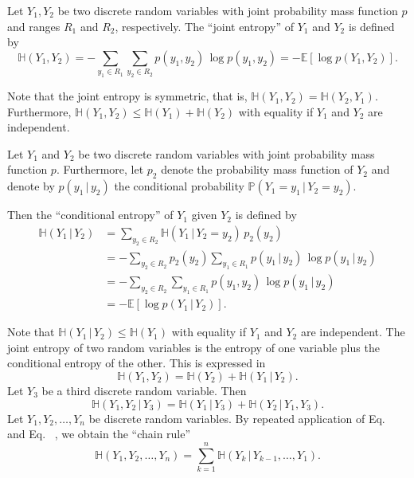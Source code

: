 \documentclass[smallextended]{svjour3}
\makeatletter
\renewcommand*{\eqref}[1]{%
  \hyperref[{#1}]{\textup{\tagform@{\ref*{#1}}}}%
}
\renewcommand{\P}{\mathbb{P}}
\newcommand{\E}{\mathbb{E}}
\renewcommand{\H}{\mathbb{H}}
\newcommand{\suml}{\sum\limits}
\newcommand{\ie}{that is}
\renewcommand{\emph}[1]{``#1''}
\makeatother
\begin{document}
\begin{definition}%
		Let $Y_1,Y_2$ be two discrete random variables with joint probability mass function $p$ and ranges $R_1$ and $R_2$, respectively.
		The \emph{joint entropy} of $Y_1$ and $Y_2$ is defined by
		\begin{equation}
			\H(Y_1,Y_2) = -\suml_{y_1\in R_1}\suml_{y_2\in R_2} p(y_1,y_2)\,\log p(y_1,y_2) = -\E\left[\log p(Y_1,Y_2)\right].
		\end{equation}
\end{definition}
Note that the joint entropy is symmetric, \ie, $\H(Y_1,Y_2) = \H(Y_2,Y_1)$.
Furthermore, $\H(Y_1,Y_2)\leq \H(Y_1) + \H(Y_2)$ with equality if $Y_1$ and $Y_2$ are independent.

\begin{definition}%
\label{def:conditional_entropy}
	Let $Y_1$ and $Y_2$ be two discrete random variables with joint probability mass function $p$.
	Furthermore, let $p_2$ denote the probability mass function of $Y_2$ and denote by $p(y_1\,|\,y_2)$ the conditional probability $\P(Y_1=y_1\,|\,Y_2=y_2)$.
	
	Then the \emph{conditional entropy} of $Y_1$ given $Y_2$ is defined by
	\begin{equation}
		\begin{aligned}
			\H(Y_1\,|\,Y_2) &= \suml_{y_2\in R_2} \H(Y_1\,|\,Y_2=y_2)\,p_2(y_2)\\
			&= -\suml_{y_2\in R_2} p_2(y_2)\suml_{y_1\in R_1}p(y_1\,|\,y_2)\,\log p(y_1\,|\,y_2)\\
			&= -\suml_{y_2\in R_2}\suml_{y_1\in R_1} p(y_1,y_2)\,\log p(y_1\,|\,y_2)\\
			&= -\E\left[\log p(Y_1\,|\,Y_2)\right].
		\end{aligned}
	\end{equation}
\end{definition}
Note that $\H(Y_1\,|\,Y_2)\leq \H(Y_1)$ with equality if $Y_1$ and $Y_2$ are independent.
The joint entropy of two random variables is the entropy of one variable plus the conditional entropy of the other.
This is expressed in 
\begin{equation}\label{eqn:two_expansion_rule}
	\H(Y_1,Y_2) = \H(Y_2) + \H(Y_1\,|\,Y_2).
\end{equation}
Let $Y_3$ be a third discrete random variable.
Then
\begin{equation}\label{eqn:three_expansion_rule}
	\H(Y_1,Y_2\,|\,Y_3) = \H(Y_1\,|\,Y_3) + \H(Y_2\,|\,Y_1,Y_3).
\end{equation}
Let $Y_1,Y_2,\ldots,Y_n$ be discrete random variables.
By repeated application of Eq.~\eqref{eqn:two_expansion_rule} and Eq.~\eqref{eqn:three_expansion_rule}, we obtain the \emph{chain rule}
\begin{equation}\label{eqn:chain_rule}
	\H(Y_1,Y_2,\ldots,Y_n) = \suml_{k=1}^n \H(Y_k\,|\,Y_{k-1},\ldots,Y_1).
\end{equation}
\end{document}
